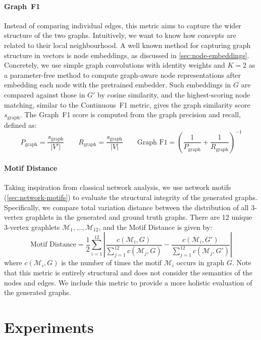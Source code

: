\paragraph{Graph~F1}
Instead of comparing individual edges, this metric aims to capture the wider structure of the two graphs. Intuitively, we want to know how concepts are related to their local neighbourhood. A well known method for capturing graph structure in vectors is node embeddings, as discussed in \cref{sec:node-embeddings}. Concretely, we use simple graph convolutions \cite{wu2019simplifying} with identity weights and $K=2$ as a parameter-free method to compute graph-aware node representations after embedding each node with the pretrained embedder. Such embeddings in $G$ are compared against those in $G'$ by cosine similarity, and the highest-scoring node matching, similar to the Continuous~F1 metric, gives the graph similarity score $s_{\text{graph}}$. The Graph~F1 score is computed from the graph precision and recall, defined as:
\[
    P_{\text{graph}} = \frac{s_{\text{graph}}}{|V'|} \qquad
    R_{\text{graph}} = \frac{s_{\text{graph}}}{|V|} \qquad
    \text{Graph~F1} = \left(\frac{1}{P_{\text{graph}}} + \frac{1}{R_{\text{graph}}}\right)^{-1}
\]

\paragraph{Motif Distance}
Taking inspiration from classical network analysis, we use network motifs (\cref{sec:network-motifs}) to evaluate the structural integrity of the generated graphs. Specifically, we compare total variation distance \cite{levin2017markov} between the distribution of all 3-vertex graphlets in the generated and ground truth graphs. There are 12 unique 3-vertex graphlets $\mathcal{M}_1, \ldots, \mathcal{M}_{12}$, and the Motif Distance is given by:
\[
    \text{Motif Distance} = \frac{1}{2} \sum_{i=1}^{12} \left|
    \frac{c(\mathcal{M}_i, G)}{\sum_{j=1}^{12} c(\mathcal{M}_j, G)} -
    \frac{c(\mathcal{M}_i, G')}{\sum_{j=1}^{12} c(\mathcal{M}_j, G')}
    \right|
\]
where $c(\mathcal{M}_i, G)$ is the number of times the motif $\mathcal{M}_i$ occurs in graph $G$. Note that this metric is entirely structural and does not consider the semantics of the nodes and edges. We include this metric to provide a more holistic evaluation of the generated graphs.


\section{Experiments}  \label{sec:experiments} \label{sec:implementation}

